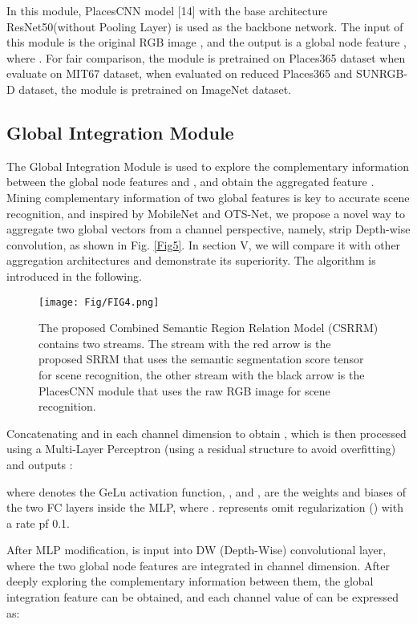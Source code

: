 \documentclass[conference]{IEEEtran}
\begin{document}
In this module, PlacesCNN model [14] with the base architecture ResNet50\cite{ref14}(without Pooling Layer) is used as the backbone network. The input of this module is the original RGB image , and the output is a global node feature , where . For fair comparison, the module is pretrained on Places365 dataset\cite{ref14} when evaluate on MIT67 dataset\cite{ref8}, when evaluated on reduced Places365 and SUNRGB-D\cite{ref30} dataset, the module is pretrained on ImageNet dataset\cite{ref32}.

\subsection{Global Integration Module}

The Global Integration Module is used to explore the complementary information between the global node features  and , and obtain the aggregated feature . Mining complementary information of two global features is key to accurate scene recognition, and inspired by MobileNet\cite{ref25} and OTS-Net\cite{ref16}, we propose a novel way to aggregate two global vectors from a channel perspective, namely, strip Depth-wise convolution, as shown in Fig. \ref{Fig5}. In section V, we will compare it with other aggregation architectures and demonstrate its superiority. The algorithm is introduced in the following.

\begin{figure}[htbp]
    \centering
    \texttt{[image: Fig/FIG4.png]}
    \caption{The proposed Combined Semantic Region Relation Model (CSRRM) contains two streams. The stream with the red arrow is the proposed SRRM that uses the semantic segmentation score tensor for scene recognition, the other stream with the black arrow is the PlacesCNN module that uses the raw RGB image for scene recognition.}
\label{Fig4}
\end{figure}

Concatenating  and  in each channel dimension to obtain , which is then processed using a Multi-Layer Perceptron (using a residual structure to avoid overfitting) and outputs :

where   denotes the GeLu activation function, ,  and ,  are the weights and biases of the two FC layers inside the MLP, where .  represents omit regularization () with a rate pf 0.1.

After MLP modification,  is input into DW (Depth-Wise) convolutional layer, where the two global node features are integrated in channel dimension. After deeply exploring the complementary information between them, the global integration feature  can be obtained, and each channel value of  can be expressed as:
\end{document}
